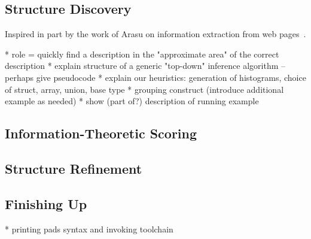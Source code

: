  




\subsection {Structure Discovery}

Inspired in part by the work of Arasu on
information extraction from web pages~\cite{arasu+:sigmod03}. 

    *  role = quickly find a description in the "approximate area" of the correct description
    * explain structure of a generic "top-down" inference algorithm -- perhaps give pseudocode
    * explain our heuristics: generation of histograms, choice of struct, array, union, base type
    * grouping construct (introduce additional example as needed)
    * show (part of?) description of running example 

\subsection {Information-Theoretic Scoring}



\subsection {Structure Refinement}

%


 

\subsection {Finishing Up}

    * printing pads syntax and invoking toolchain
